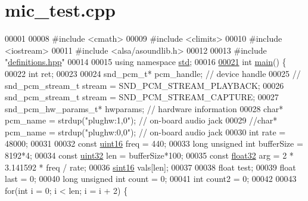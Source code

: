 \hypertarget{mic__test_8cpp_source}{\section{mic\+\_\+test.\+cpp}
\label{mic__test_8cpp_source}
}

\begin{DoxyCode}
00001 
00008 \textcolor{preprocessor}{#include <cmath>}
00009 \textcolor{preprocessor}{#include <climits>}
00010 \textcolor{preprocessor}{#include <iostream>}
00011 \textcolor{preprocessor}{#include <alsa/asoundlib.h>}
00012 
00013 \textcolor{preprocessor}{#include "\hyperlink{definitions_8hpp}{definitions.hpp}"}
00014 
00015 \textcolor{keyword}{using namespace }\hyperlink{namespacestd}{std};
00016 
\hypertarget{mic__test_8cpp_source_l00021}{}\hyperlink{mic__test_8cpp_ae66f6b31b5ad750f1fe042a706a4e3d4}{00021} \textcolor{keywordtype}{int} \hyperlink{mic__test_8cpp_ae66f6b31b5ad750f1fe042a706a4e3d4}{main}() \{
00022     \textcolor{keywordtype}{int} ret;
00023 
00024     snd\_pcm\_t* pcm\_handle;  \textcolor{comment}{// device handle}
00025 \textcolor{comment}{//  snd\_pcm\_stream\_t stream = SND\_PCM\_STREAM\_PLAYBACK;}
00026     snd\_pcm\_stream\_t stream = SND\_PCM\_STREAM\_CAPTURE;
00027     snd\_pcm\_hw\_params\_t* hwparams;  \textcolor{comment}{// hardware information}
00028     \textcolor{keywordtype}{char}* pcm\_name = strdup(\textcolor{stringliteral}{"plughw:1,0"});  \textcolor{comment}{// on-board audio jack}
00029     \textcolor{comment}{//char* pcm\_name = strdup("plughw:0,0");  // on-board audio jack}
00030     \textcolor{keywordtype}{int} rate = 48000;
00031 
00032     \textcolor{keyword}{const} \hyperlink{definitions_8hpp_a05f6b0ae8f6a6e135b0e290c25fe0e4e}{uint16} freq = 440;
00033     \textcolor{keywordtype}{long} \textcolor{keywordtype}{unsigned} \textcolor{keywordtype}{int} bufferSize = 8192*4;
00034     \textcolor{keyword}{const} \hyperlink{definitions_8hpp_a1134b580f8da4de94ca6b1de4d37975e}{uint32} len = bufferSize*100;
00035     \textcolor{keyword}{const} \hyperlink{definitions_8hpp_aacdc525d6f7bddb3ae95d5c311bd06a1}{float32} arg = 2 * 3.141592 * freq / rate;
00036     \hyperlink{definitions_8hpp_a74df79fde3c518e55b29ce6360a9c76e}{sint16} vals[len];
00037 
00038     \textcolor{keywordtype}{float} test;
00039     \textcolor{keywordtype}{float} last = 0;
00040     \textcolor{keywordtype}{long} \textcolor{keywordtype}{unsigned} \textcolor{keywordtype}{int} count = 0;
00041     \textcolor{keywordtype}{int} count2 = 0;
00042 
00043     \textcolor{keywordflow}{for}(\textcolor{keywordtype}{int} i = 0; i < len; i = i + 2) \{

\end{DoxyCode}
